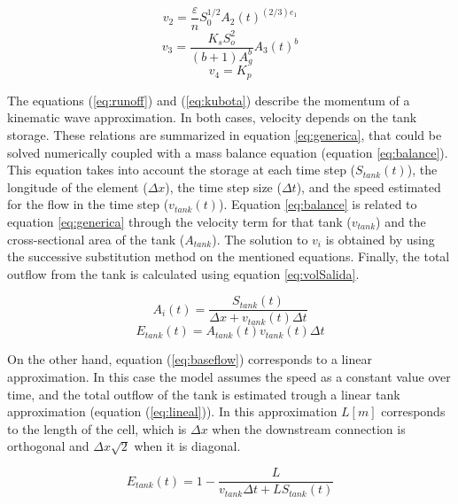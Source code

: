\documentclass[hess, manuscript]{copernicus}
\begin{document}
\begin{equation}
 v_{2} = \frac{\varepsilon}{n}  S_{0}^{1/2} A_{2}(t)^{(2/3) e_1}
    \label{eq:runoff}
\end{equation}
\begin{equation}
 v_3 = \frac{K_s S_{o}^{2}}{(b+1) A_{g}^{b}} A_{3}(t)^{b}
    \label{eq:kubota}
\end{equation}
\begin{equation}
    v_4 = K_p
    \label{eq:baseflow}
\end{equation}

The equations (\ref{eq:runoff}) and (\ref{eq:kubota}) describe the momentum of a kinematic wave approximation. In both cases, velocity depends on the tank storage. These relations are summarized in equation \ref{eq:generica},  that could be solved numerically coupled with a mass balance equation (equation \ref{eq:balance}). This equation takes into account the storage at each time step ($S_{tank}(t)$), the longitude of the element ($\Delta x$), the time step size ($\Delta t$), and the speed estimated for the flow in the time step ($v_{tank}(t)$).  Equation \ref{eq:balance} is related to equation \ref{eq:generica} through the velocity term for that tank ($v_{tank}$) and the cross-sectional area of the tank ($A_{tank}$).  The solution to $v_{i}$ is obtained by using the successive substitution method \citep{Chapra2012} on the mentioned equations.  Finally, the total outflow from the tank is calculated using equation \ref{eq:volSalida}.  

\begin{equation}
 A_i(t) = \frac{S_{tank}(t)}{\Delta x + v_{tank}(t) \Delta t}
    \label{eq:balance}
\end{equation}
\begin{equation}
    E_{tank}(t) =  A_{tank}(t) v_{tank}(t) \Delta t
     \label{eq:volSalida}
\end{equation}

On the other hand, equation (\ref{eq:baseflow}) corresponds to a linear approximation.  In this case the model assumes the speed as a constant value over time, and the total outflow of the tank is estimated trough a linear tank approximation (equation (\ref{eq:lineal})).  In this approximation $L [m]$ corresponds to the length of the cell, which is $\Delta x$ when the downstream connection is orthogonal and $\Delta x \sqrt{2}$ when it is diagonal. 

\begin{equation}
    E_{tank}(t) = 1 - \frac{L}{v_{tank}\Delta t + L S_{tank}(t)}
    \label{eq:lineal}
\end{equation}
\end{document}
